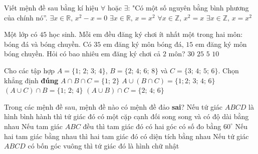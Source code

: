 \begin{ex}%
Viết mệnh đề sau bằng kí hiệu $\forall$ hoặc $\exists$: "Có một số nguyên bằng bình phương của chính nó''.
\choice
{$\exists x \in \mathbb{R},\,x^2-x=0$}
{$\exists x \in \mathbb{R},\,x=x^2$}
{$\forall x \in \mathbb{Z},\,x^2=x$}
{\True $\exists x \in \mathbb{Z},\,x=x^2$}
\end{ex}

\begin{ex}%
Một lớp có $ 45 $ học sinh. Mỗi em đều đăng ký chơi ít nhất một trong hai môn: bóng đá và bóng chuyền. Có $ 35 $ em đăng ký môn bóng đá, $ 15 $ em đăng ký môn bóng chuyền. Hỏi có bao nhiêu em đăng ký chơi cả $ 2 $ môn?
\choice
{ $ 30 $ }
{ $ 25 $ }
{\True $ 5 $ }
{ $ 10 $ }
\end{ex}

\begin{ex}%
Cho các tập hợp $A=\{1;\,2;\,3;\,4\}$, $B=\{2;\,4;\,6;\,8\}$ và $C=\{3;\,4;\,5;\,6\}$. Chọn khẳng định \textbf{đúng}
\choice
{$A\cap B\cap C=\{1;\,2\}$}
{\True $A\cup(B\cap C)=\{1;2;\,3;\,4;\,6\}$}
{$(A\cup C)\cap B=\{1;\,2;\,4\}$}
{$(A\cup B)\cap C=\{2;\,4;\,6\}$}
\end{ex}

\begin{ex}%
Trong các mệnh đề sau, mệnh đề nào có mệnh đề đảo {\bf{sai}}?
\choice
{Nếu tứ giác $ ABCD $  là hình bình hành thì tứ giác đó có một cặp cạnh đối song song và có độ dài bằng nhau}
{Nếu tam giác $ ABC $  đều thì tam giác đó có hai góc có số đo bằng $ 60^\circ $ }
{\True Nếu hai tam giác bằng nhau thì hai tam giác đó có diện tích bằng nhau}
{Nếu tứ giác $ ABCD $  có bốn góc vuông thì tứ giác đó là hình chữ nhật}
\end{ex}

